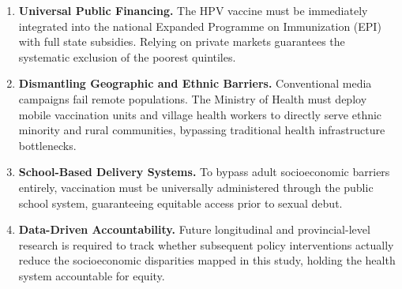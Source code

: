 \begin{enumerate}
	\item \textbf{Universal Public Financing.} The HPV vaccine must be immediately integrated into the national Expanded Programme on Immunization (EPI) with full state subsidies. Relying on private markets guarantees the systematic exclusion of the poorest quintiles.
	
	\item \textbf{Dismantling Geographic and Ethnic Barriers.} Conventional media campaigns fail remote populations. The Ministry of Health must deploy mobile vaccination units and village health workers to directly serve ethnic minority and rural communities, bypassing traditional health infrastructure bottlenecks.
	
	\item \textbf{School-Based Delivery Systems.} To bypass adult socioeconomic barriers entirely, vaccination must be universally administered through the public school system, guaranteeing equitable access prior to sexual debut.
	
	\item \textbf{Data-Driven Accountability.} Future longitudinal and provincial-level research is required to track whether subsequent policy interventions actually reduce the socioeconomic disparities mapped in this study, holding the health system accountable for equity.
\end{enumerate}

\clearpage
